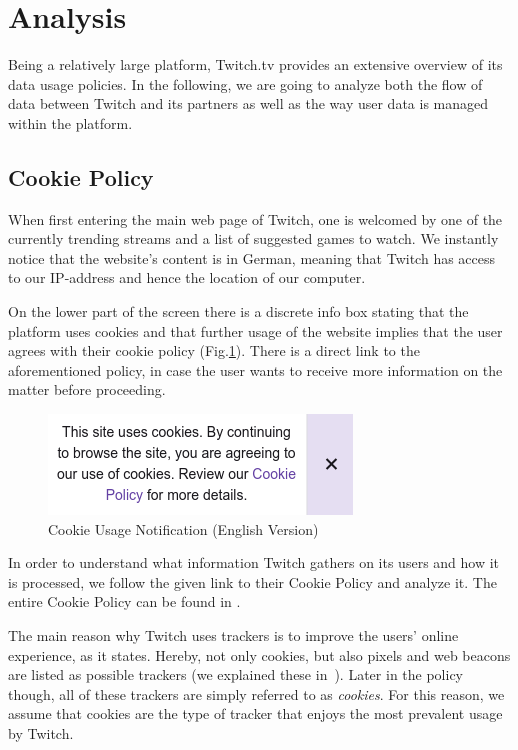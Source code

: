 \section{Analysis}\label{section:analysis}
Being a relatively large platform, Twitch.tv provides an extensive overview of its data usage policies. 
In the following, we are going to analyze both the flow of data between Twitch and its partners as well as the way user data is managed within the platform. 

\subsection{Cookie Policy}\label{section:cookie-policy}
When first entering the main web page of Twitch, one is welcomed by one of the currently trending streams and a list of suggested games to watch. 
We instantly notice that the website's content is in German, meaning that Twitch has access to our IP-address and hence the location of our computer. \par
On the lower part of the screen there is a discrete info box stating that the platform uses cookies and that further usage of the website implies that the user agrees with their cookie policy (Fig.\ref{fig:cookie_usage_notification}). 
There is a direct link to the aforementioned policy, in case the user wants to receive more information on the matter before proceeding. 
\begin{figure}[h]
\centering
\includegraphics[width=0.6\linewidth]{sections/figures/cookie_usage_notification}
\caption[]{Cookie Usage Notification (English Version)}
\label{fig:cookie_usage_notification}
\end{figure}

In order to understand what information Twitch gathers on its users and how it is processed, we follow the given link to their Cookie Policy and analyze it. The entire Cookie Policy can be found in \cite{twitch-cookie-policy}. 

The main reason why Twitch uses trackers is to improve the users' online experience, as it states. Hereby, not only cookies, but also pixels and web beacons are listed as possible trackers (we explained these in~). Later in the policy though, all of these trackers are simply referred to as \textit{cookies}. For this reason, we assume that cookies are the type of tracker that enjoys the most prevalent usage by Twitch. 

